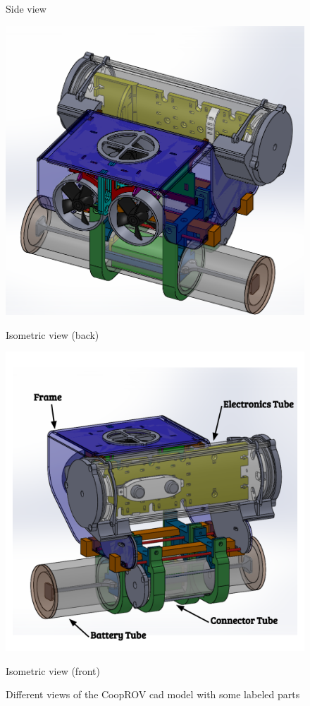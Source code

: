 \documentclass {udthesis}
\begin{document}
\begin{figure}
\begin{minipage}{0.33\textwidth}
        \caption{Side view}
        \label{fig:cooprov_sideview}
    \end{minipage}%
    \begin{minipage}{0.33\textwidth}
        \centering
        \includegraphics[width=0.95\linewidth]{cooprov_isobackview}
        \caption{Isometric view (back)}
        \label{cooprov_isobackview}
    \end{minipage}
    \begin{minipage}{0.7\textwidth}
        \centering
        \includegraphics[width=0.95\linewidth]{cooprov_labels}
        \caption{Isometric view (front)}
        \label{cooprov_labels}
    \end{minipage}
    \caption{Different views of the CoopROV \gls{cad} model with some labeled parts}
\end{figure}
\end{document}
